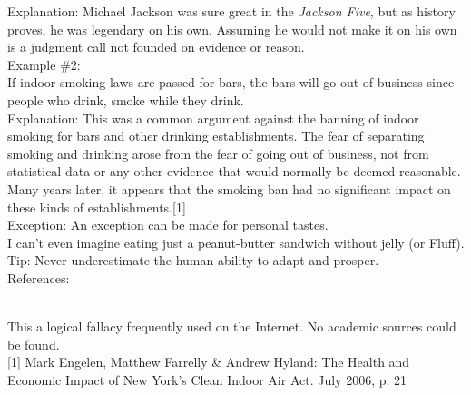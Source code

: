 \documentclass[a4paper,12pt,single,pdftex]{scrartcl}
\begin{document}
    
      Explanation: Michael Jackson was sure great in the {\it Jackson Five}, but as history proves, he was legendary on his own.  Assuming he would not make it on his own is a judgment call not founded on evidence or reason.
    \\

    
      Example \#2:
    \\

    
      If indoor smoking laws are passed for bars, the bars will go out of business since people who drink, smoke while they drink.
    \\

    
      Explanation: This was a common argument against the banning of indoor smoking for bars and other drinking establishments.  The fear of separating smoking and drinking arose from the fear of going out of business, not from statistical data or any other evidence that would normally be deemed reasonable.  Many years later, it appears that the smoking ban had no significant impact on these kinds of establishments.[1]
    \\

    
      Exception: An exception can be made for personal tastes.
    \\

    
      I can’t even imagine eating just a peanut-butter sandwich without jelly (or Fluff).
    \\

    
      Tip: Never underestimate the human ability to adapt and prosper.
    \\

    References:

    
      
        
      \\

      
        This a logical fallacy frequently used on the Internet. No academic sources could be found.
      \\

      
        [1] Mark Engelen, Matthew Farrelly \& Andrew Hyland: The Health and Economic Impact of New York's Clean Indoor Air Act. July 2006, p. 21
      \\

    
\end{document}
